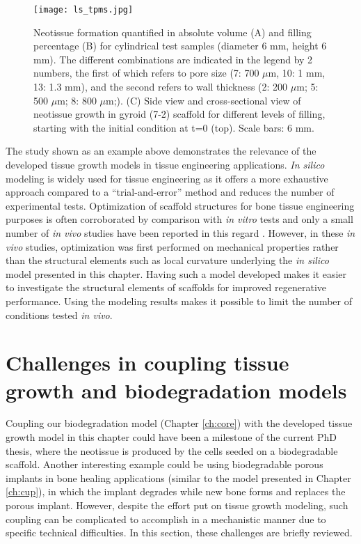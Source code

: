 \begin{figure}
\centering
\medskip
\texttt{[image: ls\_tpms.jpg]}
\caption[Simulation results of the level-set model for neotissue formation on TPMS scaffolds]{Neotissue formation quantified in absolute volume (A) and filling percentage (B) for cylindrical test samples (diameter 6 mm, height 6 mm). The different combinations are indicated in the legend by 2 numbers, the first of which refers to pore size (7: 700 $\mu$m, 10: 1 mm, 13: 1.3 mm), and the second refers to wall thickness (2: 200 $\mu$m; 5: 500 $\mu$m; 8: 800 $\mu$m;). (C) Side view and cross-sectional view of neotissue growth in gyroid (7-2) scaffold for different levels of filling, starting with the initial condition at t=0 (top). Scale bars: 6 mm.}
\label{fig:tissue_ls_tpms}
\end{figure}

The study shown as an example above \cite{Hede2021} demonstrates the relevance of the developed tissue growth models in tissue engineering applications. \textit{In silico} modeling is widely used for tissue engineering as it offers a more exhaustive approach compared to a ``trial-and-error'' method and reduces the number of experimental tests. Optimization of scaffold structures for bone tissue engineering purposes is often corroborated by comparison with \textit{in vitro} tests \cite{Alias2017,Rubert2021} and only a small number of \textit{in vivo} studies have been reported in this regard \cite{Long2012,Luo2017,Luo2015}. However, in these \textit{in vivo} studies, optimization was first performed on mechanical properties rather than the structural elements such as local curvature underlying the \textit{in silico} model presented in this chapter. Having such a model developed makes it easier to investigate the structural elements of scaffolds for improved regenerative performance. Using the modeling results makes it possible to limit the number of conditions tested \textit{in vivo}.

\section{Challenges in coupling tissue growth and biodegradation models} \label{sec:tissue_challenges}

Coupling our biodegradation model \cite{Barzegari2021} (Chapter \ref{ch:core}) with the developed tissue growth model in this chapter could have been a milestone of the current PhD thesis, where the neotissue is produced by the cells seeded on a biodegradable scaffold. Another interesting example could be using biodegradable porous implants in bone healing applications (similar to the model presented in Chapter \ref{ch:cup}), in which the implant degrades while new bone forms and replaces the porous implant. However, despite the effort put on tissue growth modeling, such coupling can be complicated to accomplish in a mechanistic manner due to specific technical difficulties. In this section, these challenges are briefly reviewed.

